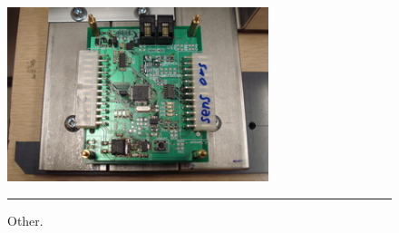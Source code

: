 {\begin{figure}[h]
\begin{center}
 \includegraphics[width=3in]{fig/dsc06469} 
\vspace{.05in}
\hrule
\caption{Other.}\label{oring}
\end{center}
\end{figure}
}